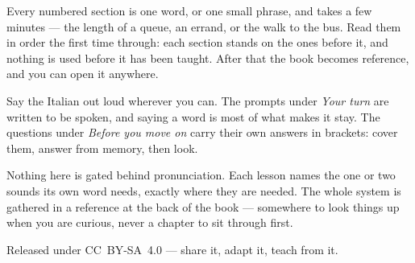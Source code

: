 \documentclass[11pt,twoside]{book}
\begin{document}
Every numbered section is one word, or one small phrase, and takes a few
minutes --- the length of a queue, an errand, or the walk to the bus. Read them
in order the first time through: each section stands on the ones before it, and
nothing is used before it has been taught. After that the book becomes
reference, and you can open it anywhere.

Say the Italian out loud wherever you can. The prompts under \emph{Your turn}
are written to be spoken, and saying a word is most of what makes it stay. The
questions under \emph{Before you move on} carry their own answers in brackets:
cover them, answer from memory, then look.

Nothing here is gated behind pronunciation. Each lesson names the one or two
sounds its own word needs, exactly where they are needed. The whole system is
gathered in a reference at the back of the book --- somewhere to look things up
when you are curious, never a chapter to sit through first.

Released under CC~BY-SA~4.0 --- share it, adapt it, teach from it.

\tableofcontents

\mainmatter


\end{document}
